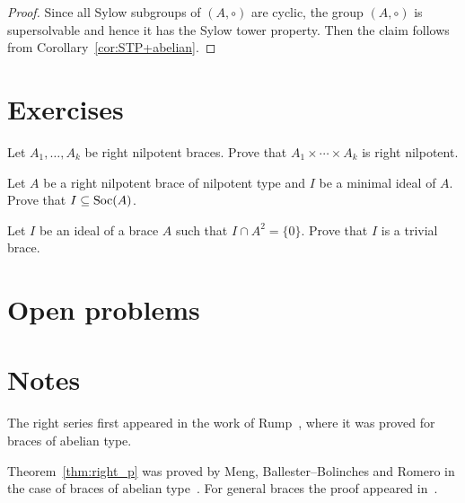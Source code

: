 \begin{proof}
    Since all Sylow subgroups of $(A,\circ)$ are cyclic, the group $(A,\circ)$ is supersolvable and hence
    it has the Sylow tower property. Then the claim follows from Corollary~\ref{cor:STP+abelian}.
\end{proof}


\section*{Exercises}

\begin{prob}
     Let $A_1,\dots,A_k$ be right nilpotent braces. Prove that 
     $A_1\times\cdots\times A_k$ is right nilpotent.
\end{prob}

\begin{prob}
    Let $A$ be a right nilpotent brace of nilpotent type and $I$ be a
    minimal ideal of $A$. Prove that $I\subseteq\operatorname{Soc}(A)$.
\end{prob}

\begin{prob}
    Let $I$ be an ideal of a brace $A$ such that $I\cap A^2=\{0\}$. Prove that $I$
    is a trivial brace.
\end{prob}

\begin{prob}
\end{prob}

\section*{Open problems}

\section*{Notes}

The right series first appeared in the work of Rump~\cite{MR2278047}, 
where it was proved for braces of abelian type. 

Theorem~\ref{thm:right_p} was proved by Meng, Ballester--Bolinches and Romero in the case of braces of abelian type~\cite{MR3935814}. For general 
braces the proof appeared in~\cite{MR4062375}. 
